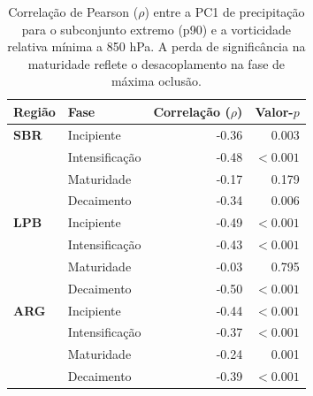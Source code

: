 \begin{table}[htbp]
\centering
\caption[Correlação de Pearson entre PC1 e vorticidade --- p90]{Correlação de Pearson ($\rho$) entre a PC1 de precipitação para o subconjunto extremo (p90) e a vorticidade relativa mínima a 850 hPa. A perda de significância na maturidade reflete o desacoplamento na fase de máxima oclusão.}
\label{tab:corr_p90_tp}
\begin{tabular*}{\textwidth}{@{\extracolsep{\fill}}llrr}
\hline
\textbf{Região} & \textbf{Fase} & \textbf{Correlação ($\rho$)} & \textbf{Valor-$p$} \\
\hline
\textbf{SBR} & Incipiente & -0.36 & 0.003 \\
 & Intensificação & -0.48 & $<0.001$ \\
 & Maturidade & -0.17 & 0.179 \\
 & Decaimento & -0.34 & 0.006 \\
\hline
\textbf{LPB} & Incipiente & -0.49 & $<0.001$ \\
 & Intensificação & -0.43 & $<0.001$ \\
 & Maturidade & -0.03 & 0.795 \\
 & Decaimento & -0.50 & $<0.001$ \\
\hline
\textbf{ARG} & Incipiente & -0.44 & $<0.001$ \\
 & Intensificação & -0.37 & $<0.001$ \\
 & Maturidade & -0.24 & 0.001 \\
 & Decaimento & -0.39 & $<0.001$ \\
\hline
\end{tabular*}
\end{table}